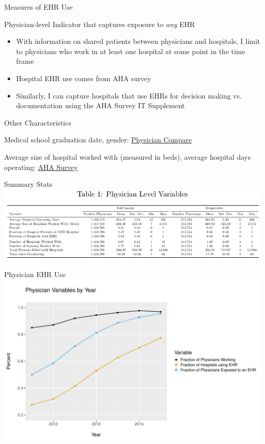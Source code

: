 \documentclass[10pt]{beamer}
\begin{document}
\begin{frame}{Measures of EHR Use}

Physician-level Indicator that captures exposure to \textit{any} EHR
\begin{itemize}
    \item With information on shared patients between physicians and hospitals, I limit to physicians who work in at least one hospital at some point in the time frame
    \item Hospital EHR use comes from AHA survey
    \item Similarly, I can capture hospitals that use EHRs for decision making vs. documentation using the AHA Survey IT Supplement 
\end{itemize}


\end{frame}

\begin{frame}{Other Characteristics}

Medical school graduation date, gender: \underline{Physician Compare}

\vspace{5mm}

Average size of hospital worked with (measured in beds), average hospital days operating: \underline{AHA Survey}
\end{frame}

\begin{frame}{Summary Stats}
\centering
    \includegraphics[scale=.7]{Objects/sumstats.pdf}
\end{frame}

\begin{frame}{Physician EHR Use}
    \centering
    \includegraphics[scale=.5]{Objects/sum_stats_year.pdf}
\end{frame}
\end{document}
